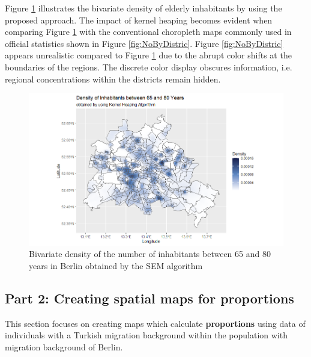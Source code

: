 Figure \ref{fig:BivDensity} illustrates the bivariate density of elderly inhabitants by using the proposed approach. 
The impact of kernel heaping becomes evident when comparing Figure \ref{fig:BivDensity} with the conventional choropleth maps commonly used in official statistics shown in Figure \ref{fig:NoByDistric}.
Figure \ref{fig:NoByDistric} appears unrealistic compared to Figure \ref{fig:BivDensity} due to the abrupt color shifts at the boundaries of the regions. The discrete color display obscures information, i.e. regional concentrations within the districts remain hidden.

\begin{figure}[h]
    \centering
    \includegraphics[scale = 0.55]{Figure/KH_Part1.png}
    \caption{Bivariate density of the number of inhabitants between 65 and 80 years in Berlin obtained by the SEM algorithm}
    \label{fig:BivDensity}
\end{figure}


\hypertarget{Part-2-Creating-spatial-maps-for-proportions}{%
\subsection{Part 2: Creating spatial maps for proportions}\label{Part-2-Creating-spatial-maps-for-proportions}}


This section focuses on creating maps which calculate \textbf{proportions} using data of individuals with a Turkish migration background within the population with migration background of Berlin. 

